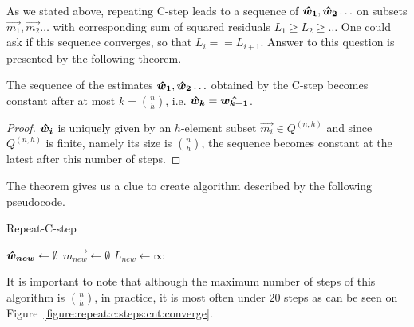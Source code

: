 As we stated above, repeating C-step leads to a sequence of $\boldsymbol{\hat{w}_1}, \boldsymbol{\hat{w}_2} \ldots$ 
on subsets $\vec{m_1}, \vec{m_2} \ldots$ with corresponding sum of squared residuals 
$L_1 \geq L_2\geq \ldots$ One could ask if this sequence converges, so that $L_i == L_{i+1}$. 
Answer to this question is presented by the following theorem.




\begin{theorem}
    The sequence of the estimates $\boldsymbol{\hat{w}_1}, \boldsymbol{\hat{w}_2} \ldots$ obtained by the C-step becomes constant after at most $k = {n \choose h}$, i.e. $\boldsymbol{\hat{w}_k} = \boldsymbol{\hat{w_{k+1}}}$.
\end{theorem}

\begin{proof}
    $\boldsymbol{\hat{w}_{i}}$  is uniquely given by  an $h$-element subset $\vec{m_i} \in Q^{(n, h)}$ and since $Q^{(n, h)}$ is finite,  namely its size is ${n \choose h}$, the sequence becomes constant at the latest after this number of steps.
\end{proof}



The theorem gives us a clue to create algorithm described by the following pseudocode.

\begin{algorithm}[H]
    \label{alg:RepeatCstep}
    \caption{Repeat-C-step}
    $\boldsymbol{\hat{w}_{new}} \gets \emptyset$\;
    $\vec{m_{new}} \gets \emptyset$\;
    $L_{new} \gets \infty $\;


    \;
\end{algorithm}

It is important to note that although the maximum number of steps of this algorithm is ${n \choose h}$, in practice, it is most often under $20$ steps as can be seen on Figure~\ref{figure:repeat:c:steps:cnt:converge}.

